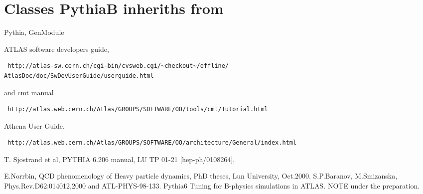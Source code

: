 \section{Classes PythiaB inheriths from}
Pythia, GenModule



\begin{thebibliography}{9}

 ATLAS software developers guide, 
   \begin{verbatim} http://atlas-sw.cern.ch/cgi-bin/cvsweb.cgi/~checkout~/offline/ 
AtlasDoc/doc/SwDevUserGuide/userguide.html
\end{verbatim}
and cmt manual
\begin{verbatim} http://atlas.web.cern.ch/Atlas/GROUPS/SOFTWARE/OO/tools/cmt/Tutorial.html
\end{verbatim}
 Athena User Guide, 

\begin{verbatim} http://atlas.web.cern.ch/Atlas/GROUPS/SOFTWARE/OO/architecture/General/index.html
\end{verbatim}

 T. Sjostrand et al,  PYTHIA 6.206 manual, LU TP 01-21 [hep-ph/0108264], 

 E.Norrbin, QCD phenomenology of Heavy particle dynamics, PhD theses, Lun University, Oct.2000.
  S.P.Baranov, M.Smizanska, Phys.Rev.D62:014012,2000 and ATL-PHYS-98-133.
 Pythia6 Tuning for B-physics simulations in ATLAS.
NOTE under the preparation.

\end{thebibliography}


